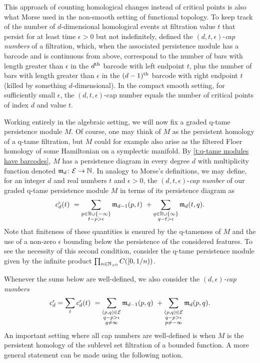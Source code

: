 This approach of counting homological changes instead of critical points is also what Morse used in the non-smooth setting of functional topology.
To keep track of the number of $d$-dimensional homological events at filtration value $t$ that persist for at least time $\epsilon > 0$ but not indefinitely, \cite{Morse.1940} defined the $(d, t, \epsilon)$-\emph{cap numbers} of a filtration, which, when the associated persistence module has a barcode and is continuous from above, correspond to the number of bars with length greater than $\epsilon$ in the $d^{\mathrm{th}}$ barcode with left endpoint $t$, plus the number of bars with length greater than $\epsilon$ in the $(d-1)^{\mathrm{th}}$ barcode with right endpoint $t$ (killed by something $d$-dimensional).
In the compact smooth setting, for sufficiently small $\epsilon$, the $(d, t, \epsilon)$-cap number equals the number of critical points of index $d$ and value $t$.

Working entirely in the algebraic setting, we will now fix a graded q-tame persistence module $M$.
Of course, one may think of $M$ as the persistent homology of a q-tame filtration, but $M$ could for example also arise as the filtered Floer homology of some Hamiltonian on a symplectic manifold.
By \cref{t:q-tame modules have barcodes}, $M$ has a persistence diagram in every degree $d$ with multiplicity function denoted $\mathfrak{m}_d \colon \mathcal{E} \to \mathbb{N}$.
In analogy to Morse's definitions, we may define, for an integer $d$ and real numbers $t$ and $\epsilon > 0$, the $(d, t, \epsilon)$-\emph{cap number} of our graded q-tame persistence module $M$ in terms of its persistence diagram as
\begin{equation*}
c_{d}^{\epsilon}(t) \ =
\sum_{\substack{p \in \mathbb{R} \cup \{-\infty\} \\ t - p > \epsilon}} \mathfrak{m}_{d-1}(p, t) \ +
\sum_{\substack{q \in \mathbb{R} \cup \{\infty\} \\ q - t > \epsilon}} \mathfrak{m}_d(t, q).
\end{equation*}
Note that finiteness of these quantities is ensured by the q-tameness of $M$ and the use of a non-zero $\epsilon$ bounding below the persistence of the considered features.
To see the necessity of this second condition, consider the q-tame persistence module given by the infinite product $\prod_{n \in \mathbb{N}_{> 0}} C([0,1/n))$.

Whenever the sums below are well-defined, we also consider the \emph{$(d,\epsilon)$-cap numbers}
\[
c_{d}^{\epsilon} =
\sum_{t} c_{d}^{\epsilon}(t) \ =
\sum_{\substack{(p,q) \in \mathcal{E} \\ q - p > \epsilon \\ q \neq \infty}} \mathfrak{m}_{d-1}(p,q) \ +
\sum_{\substack{(p,q) \in \mathcal{E} \\ q - p > \epsilon \\ p \neq -\infty}}\mathfrak{m}_d(p,q).
\]
An important setting where all cap numbers are well-defined is when $M$ is the persistent homology of the sublevel set filtration of a bounded function.
A more general statement can be made using the following notion.

